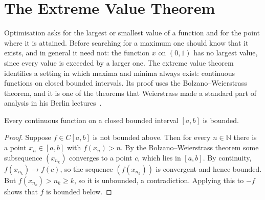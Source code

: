 \begin{figure}
\end{figure}

\section{The Extreme Value Theorem}
\label{sec:evt}

Optimisation asks for the largest or smallest value of a function and for the point where it is attained. Before searching for a maximum one should know that it exists, and in general it need not: the function $x$ on $(0,1)$ has no largest value, since every value is exceeded by a larger one. The extreme value theorem identifies a setting in which maxima and minima always exist: continuous functions on closed bounded intervals. Its proof uses the Bolzano--Weierstrass theorem, and it is one of the theorems that Weierstrass made a standard part of analysis in his Berlin lectures~\cite{hairer1996analysis}.

\begin{theorem}
\label{thm:bounded}
Every continuous function on a closed bounded interval $[a,b]$ is bounded.
\end{theorem}

\begin{proof}
Suppose $f\in C[a,b]$ is not bounded above. Then for every $n\in\mathbb N$ there is a point $x_n\in[a,b]$ with $f(x_n)>n$. By the Bolzano--Weierstrass theorem some subsequence $(x_{n_k})$ converges to a point $c$, which lies in $[a,b]$. By continuity, $f(x_{n_k})\to f(c)$, so the sequence $(f(x_{n_k}))$ is convergent and hence bounded. But $f(x_{n_k})>n_k\ge k$, so it is unbounded, a contradiction. Applying this to $-f$ shows that $f$ is bounded below.
\end{proof}

